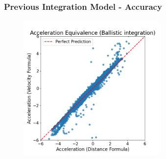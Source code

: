\begin{frame}
    \frametitle{Previous Integration Model - Accuracy}
    \begin{figure}
        \centering
        \includegraphics[width=0.65\textwidth]{figures/graphs/Acceleration Equivalence (Ballistic integration).png}
    \end{figure}
\end{frame}


